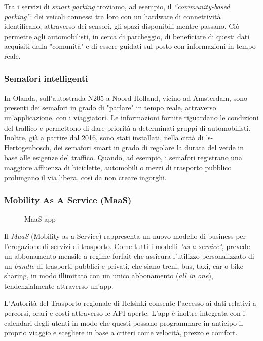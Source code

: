Tra i servizi di \textit{smart parking} troviamo, ad esempio, il \textit{“community-based parking”}: dei veicoli connessi tra loro con un hardware di connettività identificano, attraverso dei sensori, gli spazi disponibili mentre passano. Ciò permette agli automobilisti, in cerca di parcheggio, di beneficiare di questi dati acquisiti dalla "comunità" e di essere guidati sul posto con informazioni in tempo reale. 

\subsubsection{Semafori intelligenti}

In Olanda, sull’autostrada N205 a Noord-Holland, vicino ad Amsterdam, sono presenti dei semafori in grado di "parlare" in tempo reale, attraverso un'applicazione, con i viaggiatori. Le informazioni fornite riguardano le condizioni del traffico e permettono di dare priorità a determinati gruppi di automobilisti. Inoltre, già a partire dal 2016, sono stati installati, nella città di 's-Hertogenbosch, dei semafori smart in grado di regolare la durata del verde in base alle esigenze del traffico. Quando, ad esempio, i semafori registrano una maggiore affluenza di biciclette, automobili o mezzi di trasporto pubblico prolungano il via libera, così da non creare ingorghi. 

\subsubsection{Mobility As A Service (MaaS)}

\begin{wrapfigure}{r}{0.4\textwidth}
\centering
{}
\caption{MaaS app}
\label{fig:maas}
\end{wrapfigure}

Il \textit{MaaS} (Mobility as a Service) rappresenta un nuovo modello di business per l'erogazione di servizi di trasporto. Come tutti i modelli \textit{"as a service"}, prevede un abbonamento mensile a regime forfait che assicura l'utilizzo personalizzato di un \textit{bundle} di trasporti pubblici e privati, che siano treni, bus, taxi, car o bike sharing, in modo illimitato con un unico abbonamento (\textit{all in one}), tendenzialmente attraverso un'app. 

L’Autorità del Trasporto regionale di Helsinki consente l’accesso ai dati relativi a percorsi, orari e costi attraverso le API aperte. L’app è inoltre integrata con i calendari degli utenti in modo che questi possano programmare in anticipo il proprio viaggio e scegliere in base a criteri come velocità, prezzo e comfort.

